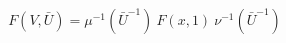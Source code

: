 \begin{equation}
F(V,\bar{U})= \mu^{-1} (\bar{U}^{-1})~F(x,1)~\nu^{-1}(\bar{U}^{-1})
\end{equation}

